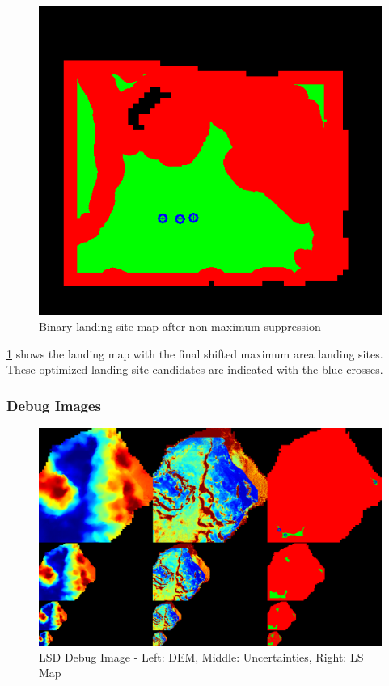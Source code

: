 \begin{figure}[ht!]
    \centering
    \includegraphics[scale=0.5]{images/system_overview/landing_map_marked.png}
    \caption{Binary landing site map after non-maximum suppression}
    \label{fig:ls_map_nps}
\end{figure}

\cref{fig:ls_map_nps} shows the landing map with the final shifted maximum area landing sites. These optimized landing site candidates are indicated with the blue crosses. 


\subsubsection{Debug Images}

\begin{figure}[ht!]
    \centering
    \includegraphics[scale=0.23]{images/system_overview/Flagship.png}
    \caption{LSD Debug Image - Left: DEM, Middle: Uncertainties, Right: LS Map}
    \label{fig:lsd_debug} 
\end{figure}

